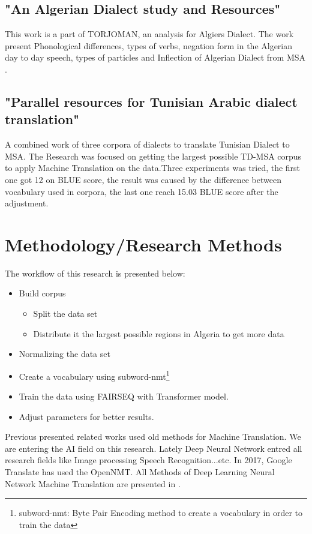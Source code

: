 \documentclass[paper=a4, fontsize=11pt]{scrartcl}
\numberwithin{equation}{section}		%
\numberwithin{figure}{section}			%
\numberwithin{table}{section}				%
\begin{document}
\subsection{"An Algerian Dialect study and Resources" \cite{harrat2016algerian}}
This work is a part of TORJOMAN\cite{harrat2014building}, an analysis for Algiers Dialect. The work present Phonological differences, types of verbs, negation form in the Algerian day to day speech, types of particles and Inflection of Algerian Dialect from MSA \cite{harrat2016algerian}.    
\subsection{ "Parallel resources for Tunisian Arabic dialect translation" \cite{kchaou2020parallel}}
A combined work of three corpora of dialects to translate Tunisian Dialect to MSA. The Research was focused on getting the largest possible TD-MSA corpus to apply Machine Translation on the data.Three experiments was tried, the first one got 12 on BLUE score, the result was caused by the difference between vocabulary used in corpora, the last one reach 15.03 BLUE score after the adjustment.

\pagebreak
\section{Methodology/Research Methods}

The workflow of this research is presented below:
\begin{itemize}
    \item Build corpus 
    \begin{itemize}
        \item Split the data set
        \item Distribute it the largest possible regions in Algeria to get more data
    \end{itemize}
    \item Normalizing the data set
    \item Create a vocabulary using subword-nmt\footnote{subword-nmt: Byte Pair Encoding method to create a vocabulary in order to train the data }
    \item Train the data using FAIRSEQ\cite{ott2019fairseq} with Transformer model.
    \item Adjust parameters for better results.
\end{itemize}

Previous presented related works used old methods for Machine Translation. We are entering the AI field on this research. Lately Deep Neural Network entred all research fields like Image processing Speech Recognition...etc. In 2017, Google Translate has used the OpenNMT. All Methods of Deep Learning Neural Network Machine Translation are presented in \cite{zhang2015deep}.
\end{document}

